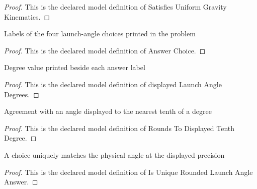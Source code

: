 \begin{proof}
  This is the declared model definition of Satisfies Uniform Gravity Kinematics.
\end{proof}
\begin{definition}
  \label{def:physics:phyx-mini-0741:phyxminiproblems-problemphyxmini0741-answerchoice}
  Labels of the four launch-angle choices printed in the problem
\end{definition}
\begin{proof}
  This is the declared model definition of Answer Choice.
\end{proof}
\begin{definition}
  \label{def:physics:phyx-mini-0741:phyxminiproblems-problemphyxmini0741-displayedlaunchangledegrees}
  Degree value printed beside each answer label
\end{definition}
\begin{proof}
  This is the declared model definition of displayed Launch Angle Degrees.
\end{proof}
\begin{definition}
  \label{def:physics:phyx-mini-0741:phyxminiproblems-problemphyxmini0741-roundstodisplayedtenthdegree}
  Agreement with an angle displayed to the nearest tenth of a degree
\end{definition}
\begin{proof}
  This is the declared model definition of Rounds To Displayed Tenth Degree.
\end{proof}
\begin{definition}
  \label{def:physics:phyx-mini-0741:phyxminiproblems-problemphyxmini0741-isuniqueroundedlaunchangleanswer}
  A choice uniquely matches the physical angle at the displayed precision
\end{definition}
\begin{proof}
  This is the declared model definition of Is Unique Rounded Launch Angle Answer.
\end{proof}
